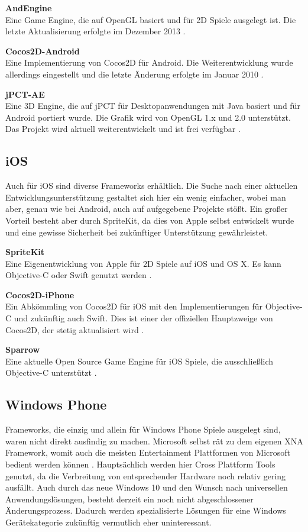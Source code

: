\bigskip
\textbf{AndEngine}\\
Eine Game Engine, die auf OpenGL basiert und für 2D Spiele ausgelegt ist.
Die letzte Aktualisierung erfolgte im Dezember 2013 \citep{andEngine}.

\bigskip
\textbf{Cocos2D-Android}\\
Eine Implementierung von Cocos2D für Android. Die Weiterentwicklung wurde allerdings eingestellt und die letzte Änderung erfolgte im Januar 2010 \citep{cocos2d_android}.

\bigskip
\textbf{jPCT-AE}\\
Eine 3D Engine, die auf jPCT für Desktopanwendungen mit Java basiert und für Android portiert wurde. Die Grafik wird von OpenGL 1.x und 2.0 unterstützt. Das Projekt wird aktuell weiterentwickelt und ist frei verfügbar \citep{jpct_ae}.


\subsection{iOS}
Auch für iOS sind diverse Frameworks erhältlich. Die Suche nach einer aktuellen Entwicklungsunterstützung gestaltet sich hier ein wenig einfacher, wobei man aber, genau wie bei Android, auch auf aufgegebene Projekte stößt. Ein großer Vorteil besteht aber durch SpriteKit, da dies von Apple selbst entwickelt wurde und eine gewisse Sicherheit bei zukünftiger Unterstützung gewährleistet.

\bigskip
\textbf{SpriteKit}\\
Eine Eigenentwicklung von Apple für 2D Spiele auf iOS und OS X. Es kann Objective-C oder Swift genutzt werden \citep{about_spritekit}.

\bigskip
\textbf{Cocos2D-iPhone}\\
Ein Abkömmling von Cocos2D für iOS mit den Implementierungen für Objective-C und zukünftig auch Swift. Dies ist einer der offiziellen Hauptzweige von Cocos2D, der stetig aktualisiert wird \citep{cocos2d_iphone}.

\bigskip
\textbf{Sparrow}\\
Eine aktuelle Open Source Game Engine für iOS Spiele, die ausschließlich Objective-C unterstützt \citep{sparrow}.


\subsection{Windows Phone}
Frameworks, die einzig und allein für Windows Phone Spiele ausgelegt sind, waren nicht direkt ausfindig zu machen. Microsoft selbst rät zu dem eigenen XNA Framework, womit auch die meisten Entertainment Plattformen von Microsoft bedient werden können \citep{xna}. Hauptsächlich werden hier Cross Plattform Tools genutzt, da die Verbreitung von entsprechender Hardware noch relativ gering ausfällt. Auch durch das neue Windows 10 und den Wunsch nach universellen Anwendungslösungen, besteht derzeit ein noch nicht abgeschlossener Änderungsprozess. Dadurch werden spezialisierte Lösungen für eine Windows Gerätekategorie zukünftig vermutlich eher uninteressant.


